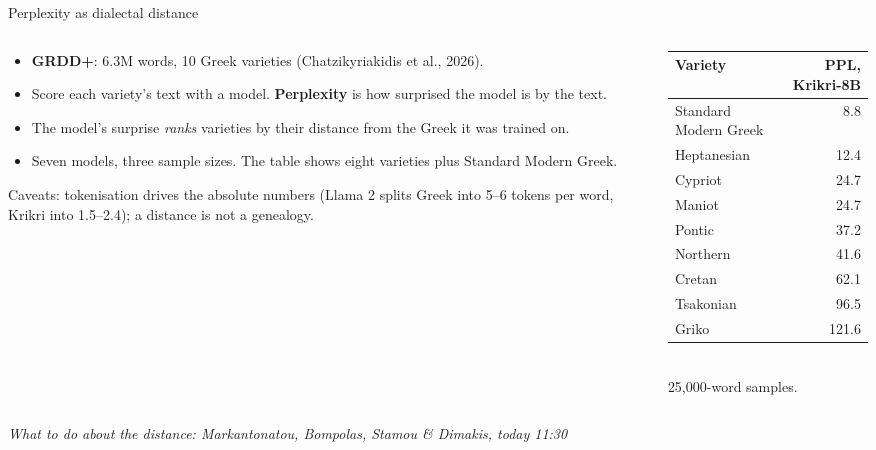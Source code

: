 \documentclass[aspectratio=169, 10pt]{beamer}
\newcommand{\handoff}[1]{\vfill\begin{flushright}\footnotesize\textcolor{slate}{\textit{#1}}\end{flushright}}
\newcommand{\key}[1]{\textcolor{aegean}{\textbf{#1}}}
\begin{document}
\begin{frame}{Perplexity as dialectal distance}
  \small
  \begin{columns}[T]
    \begin{column}{0.52\textwidth}
      \begin{itemize}
        \item \key{GRDD+}: 6.3M words, 10 Greek varieties (Chatzikyriakidis et al., 2026).
        \item Score each variety's text with a model. \textbf{Perplexity} is how surprised the model is by the text.
        \item The model's surprise \emph{ranks} varieties by their distance from the Greek it was trained on.
        \item Seven models, three sample sizes. The table shows eight varieties plus Standard Modern Greek.
      \end{itemize}
      \vspace{0.5em}
      \scriptsize Caveats: tokenisation drives the absolute numbers (Llama 2 splits Greek into 5--6 tokens per word, Krikri into 1.5--2.4); a distance is not a genealogy.
    \end{column}
    \begin{column}{0.44\textwidth}
      \centering
      \footnotesize
      \begin{tabular}{lr}
        \toprule
        \textbf{Variety} & \textbf{PPL, Krikri-8B} \\
        \midrule
        Standard Modern Greek & 8.8 \\
        Heptanesian & 12.4 \\
        Cypriot & 24.7 \\
        Maniot & 24.7 \\
        Pontic & 37.2 \\
        Northern & 41.6 \\
        Cretan & 62.1 \\
        Tsakonian & 96.5 \\
        Griko & 121.6 \\
        \bottomrule
      \end{tabular}\\[3pt]
      \tiny 25,000-word samples.
    \end{column}
  \end{columns}
  \handoff{What to do about the distance: Markantonatou, Bompolas, Stamou \& Dimakis, today 11:30}
\end{frame}
\end{document}
